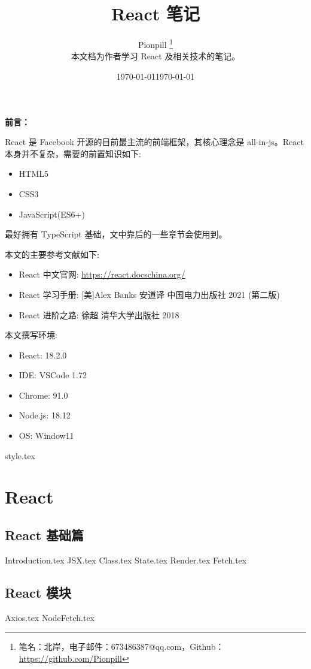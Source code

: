 \documentclass{PionpillNote-book}
\title{React 笔记}
\author{
    Pionpill \footnote{笔名：北岸，电子邮件：673486387@qq.com，Github：\url{https://github.com/Pionpill}} \\
    本文档为作者学习 React 及相关技术的笔记。\\
}
\date{\today}
\begin{document}
\pagestyle{plain}
\maketitle

\noindent\textbf{前言：}

React 是 Facebook 开源的目前最主流的前端框架，其核心理念是 all-in-js。React 本身并不复杂，需要的前置知识如下:
\begin{itemize}
    \item HTML5
    \item CSS3
    \item JavaScript(ES6+)
\end{itemize}

最好拥有 TypeScript 基础，文中靠后的一些章节会使用到。

本文的主要参考文献如下:
\begin{itemize}
    \item React 中文官网: \url{https://react.docschina.org/}
    \item React 学习手册: [美]Alex Banks 安道译 中国电力出版社 2021 (第二版)
    \item React 进阶之路: 徐超 清华大学出版社 2018
\end{itemize}

本文撰写环境:

\begin{itemize}
    \item React: 18.2.0
    \item IDE: VSCode 1.72 
    \item Chrome: 91.0
    \item Node.js: 18.12
    \item OS: Window11
\end{itemize}

\date{\today}
\newpage

\tableofcontents

\newpage

\setcounter{page}{1} 
\pagestyle{fancy}

{style.tex}
\part{React}
\chapter{React 基础篇}
{Introduction.tex}
{JSX.tex}
{Class.tex}
{State.tex}
{Render.tex}
{Fetch.tex}
\chapter{React 模块}
{Axios.tex}
{NodeFetch.tex}
\end{document}

